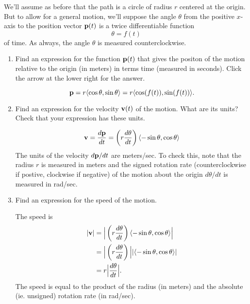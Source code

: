 \documentclass{ximera}
\begin{document}
\begin{question} \label{Q324234fgfg}
We'll assume as before that the path is a circle of radius $r$ centered at the origin. But to allow for a general motion, we'll suppose the angle $\theta$ from the positive $x$-axis to the position vector ${\bf p}(t)$ is a twice differentiable function
\[
   \theta = f(t)
\]
of time. As always, the angle $\theta$ is measured counterclockwise. 

\begin{enumerate}
\item Find an expression for the function ${\bf p}(t)$ that gives the positon of the motion relative to the origin (in meters) in terms time (measured in seconds). Click the arrow at the lower right for the answer.

\begin{expandable}
\[
   {\bf p} = r \langle \cos \theta , \sin\theta \rangle = r \langle \cos (f(t)) , \sin (f(t)) \rangle .
\]
\end{expandable}

\item Find an expression for the velocity ${\bf v}(t)$ of the motion. What are its units? Check that your expression has these units.
\begin{expandable}
\[
   {\bf v} = \frac{d{\bf p}}{dt}  = \left( r \frac{d\theta}{dt} \right) \langle -\sin \theta , \cos\theta \rangle  \\
\]
The units of the velocity $d{\bf p}/dt$ are meters/sec. To check this, note that the radius $r$ is measured in meters and the signed rotation rate (counterclockwise if postive, clockwise if negative) of the motion about the origin $d\theta/dt$ is measured in rad/sec.
\end{expandable}

\item Find an expression for the speed of the motion.

\begin{expandable}
The speed is
\begin{align*}
  | {\bf v} |  & = \Big|  \left( r \frac{d\theta}{dt} \right) \langle -\sin \theta , \cos\theta \rangle \Big|   \\
                & =  \Big| \left( r \frac{d\theta}{dt} \right) \Big| |  \langle -\sin \theta , \cos\theta \rangle  | \\
                &= r \Big|\frac{d\theta}{dt} \Big| .
\end{align*}
The speed is equal to the product of the radius (in meters) and the absolute (ie. unsigned) rotation rate (in rad/sec).
\end{expandable}


\end{enumerate}
\end{question}
\end{document}
